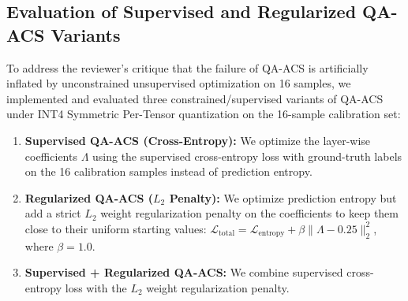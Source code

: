 \documentclass{article}
\theoremstyle{plain}
\theoremstyle{definition}
\theoremstyle{remark}
\begin{document}
\subsection{Evaluation of Supervised and Regularized QA-ACS Variants}
To address the reviewer's critique that the failure of QA-ACS is artificially inflated by unconstrained unsupervised optimization on 16 samples, we implemented and evaluated three constrained/supervised variants of QA-ACS under INT4 Symmetric Per-Tensor quantization on the 16-sample calibration set:
\begin{enumerate}
  \item \textbf{Supervised QA-ACS (Cross-Entropy):} We optimize the layer-wise coefficients $\Lambda$ using the supervised cross-entropy loss with ground-truth labels on the 16 calibration samples instead of prediction entropy.
  \item \textbf{Regularized QA-ACS ($L_2$ Penalty):} We optimize prediction entropy but add a strict $L_2$ weight regularization penalty on the coefficients to keep them close to their uniform starting values: $\mathcal{L}_{\text{total}} = \mathcal{L}_{\text{entropy}} + \beta \|\Lambda - 0.25\|^2_2$, where $\beta = 1.0$.
  \item \textbf{Supervised + Regularized QA-ACS:} We combine supervised cross-entropy loss with the $L_2$ weight regularization penalty.
\end{enumerate}

\begin{table}[H]
\centering
\caption{Performance comparison of supervised and regularized QA-ACS variants under INT4 Symmetric Per-Tensor Quantization.}
\label{tab:qa_acs_variants}
\vskip 0.1in
\end{table}
\end{document}
